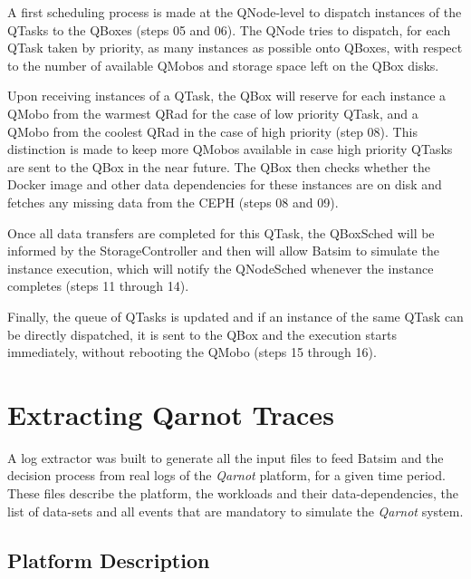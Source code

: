 A first scheduling process is made at the QNode-level to dispatch instances of the QTasks to the QBoxes (steps 05 and 06). The QNode tries to dispatch, for each QTask taken by priority, as many instances as possible onto QBoxes, with respect to the number of available QMobos and storage space left on the QBox disks.

Upon receiving instances of a QTask, the QBox will reserve for each instance a QMobo from the warmest QRad for the case of low priority QTask, and a QMobo from the coolest QRad in the case of high priority (step 08).
This distinction is made to keep more QMobos available in case high priority QTasks are sent to the QBox in the near future. The QBox then checks whether the Docker image and other data dependencies for these instances are on disk and fetches any missing data from the CEPH (steps 08 and 09).

Once all data transfers are completed for this QTask, the QBoxSched will be informed by the StorageController and then will allow Batsim to simulate the instance execution, which will notify the QNodeSched whenever the instance completes (steps 11 through 14). 

Finally, the queue of QTasks is updated and if an instance of the same QTask can be directly dispatched, it is sent to the QBox and the execution starts immediately, without rebooting the QMobo (steps 15 through 16).

\section{Extracting Qarnot Traces}
\label{secsec:traces}

A log extractor was built to generate all the input files to feed Batsim and the decision process from real logs of the \emph{Qarnot} platform, for a given time period.
These files describe the platform, the workloads and their data-dependencies, the list of data-sets and all events that are mandatory to simulate the \emph{Qarnot} system.


\subsection{Platform Description}


